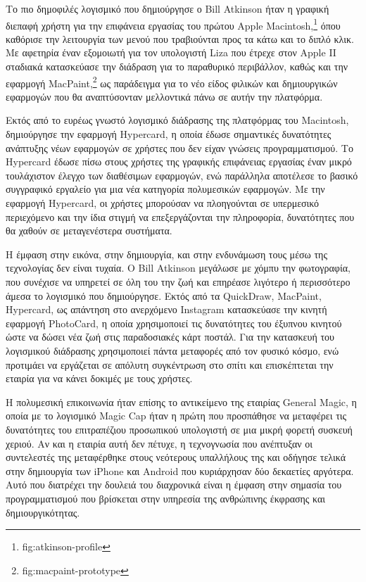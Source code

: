 \documentclass[
]{article}
\begin{document}
Το πιο δημοφιλές λογισμικό που δημιούργησε ο Bill Atkinson ήταν η
γραφική διεπαφή χρήστη για την επιφάνεια εργασίας του πρώτου Apple
Macintosh,\footnote{fig:atkinson-profile} όπου καθόρισε την λειτουργία
των μενού που τραβιούνται προς τα κάτω και το διπλό κλικ. Με αφετηρία
έναν εξομοιωτή για τον υπολογιστή Liza που έτρεχε στον Apple II σταδιακά
κατασκεύασε την διάδραση για το παραθυρικό περιβάλλον, καθώς και την
εφαρμογή MacPaint,\footnote{fig:macpaint-prototype} ως παράδειγμα για το
νέο είδος φιλικών και δημιουργικών εφαρμογών που θα αναπτύσονταν
μελλοντικά πάνω σε αυτήν την πλατφόρμα.

Εκτός από το ευρέως γνωστό λογισμικό διάδρασης της πλατφόρμας του
Macintosh, δημιούργησε την εφαρμογή Hypercard, η οποία έδωσε σημαντικές
δυνατότητες ανάπτυξης νέων εφαρμογών σε χρήστες που δεν είχαν γνώσεις
προγραμματισμού. Το Hypercard έδωσε πίσω στους χρήστες της γραφικής
επιφάνειας εργασίας έναν μικρό τουλάχιστον έλεγχο των διαθέσιμων
εφαρμογών, ενώ παράλληλα αποτέλεσε το βασικό συγγραφικό εργαλείο για μια
νέα κατηγορία πολυμεσικών εφαρμογών. Με την εφαρμογή Hypercard, οι
χρήστες μπορούσαν να πλοηγούνται σε υπερμεσικό περιεχόμενο και την ίδια
στιγμή να επεξεργάζονται την πληροφορία, δυνατότητες που θα χαθούν σε
μεταγενέστερα συστήματα.

Η έμφαση στην εικόνα, στην δημιουργία, και στην ενδυνάμωση τους μέσω της
τεχνολογίας δεν είναι τυχαία. Ο Bill Atkinson μεγάλωσε με χόμπυ την
φωτογραφία, που συνέχισε να υπηρετεί σε όλη του την ζωή και επηρέασε
λιγότερο ή περισσότερο άμεσα το λογισμικό που δημιούργησε. Εκτός από τα
QuickDraw, MacPaint, Hypercard, ως απάντηση στο ανερχόμενο Instagram
κατασκεύασε την κινητή εφαρμογή PhotoCard, η οποία χρησιμοποιεί τις
δυνατότητες του έξυπνου κινητού ώστε να δώσει νέα ζωή στις παραδοσιακές
κάρτ ποστάλ. Για την κατασκευή του λογισμικού διάδρασης χρησιμοποιεί
πάντα μεταφορές από τον φυσικό κόσμο, ενώ προτιμάει να εργάζεται σε
απόλυτη συγκέντρωση στο σπίτι και επισκέπτεται την εταιρία για να κάνει
δοκιμές με τους χρήστες.

Η πολυμεσική επικοινωνία ήταν επίσης το αντικείμενο της εταιρίας General
Magic, η οποία με το λογισμικό Magic Cap ήταν η πρώτη που προσπάθησε να
μεταφέρει τις δυνατότητες του επιτραπέζιου προσωπικού υπολογιστή σε μια
μικρή φορετή συσκευή χεριού. Αν και η εταιρία αυτή δεν πέτυχε, η
τεχνογνωσία που ανέπτυξαν οι συντελεστές της μεταφέρθηκε στους νεότερους
υπαλλήλους της και οδήγησε τελικά στην δημιουργία των iPhone και Android
που κυριάρχησαν δύο δεκαετίες αργότερα. Αυτό που διατρέχει την δουλειά
του διαχρονικά είναι η έμφαση στην σημασία του προγραμματισμού που
βρίσκεται στην υπηρεσία της ανθρώπινης έκφρασης και δημιουργικότητας.
\end{document}
